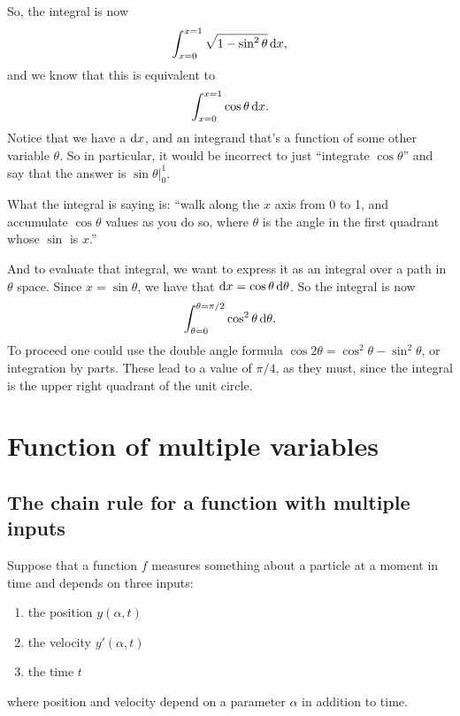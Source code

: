 \begin{example}
  So, the integral is now
  \begin{align*}
     \int _{x=0}^{x=1} \sqrt {1-\sin^{2} \theta} \dx,
  \end{align*}
  and we know that this is equivalent to
  \begin{align*}
     \int _{x=0}^{x=1} \cos \theta \dx.
  \end{align*}
  Notice that we have a $\dx$, and an integrand that's a function of some other variable $\theta$. So in
  particular, it would be incorrect to just ``integrate $\cos \theta$'' and say that the answer is
  $\sin \theta\Big|_0^1$.

  What the integral is saying is: ``walk along the $x$ axis from 0 to 1, and accumulate $\cos \theta$ values as
  you do so, where $\theta$ is the angle in the first quadrant whose $\sin$ is $x$.''

  And to evaluate that integral, we want to express it as an integral over a path in $\theta$
  space. Since $x = \sin \theta$, we have that $\dx = \cos \theta \d\theta$. So the integral is now
  \begin{align*}
    \int_{\theta=0}^{\theta=\pi/2} \cos^2 \theta \d\theta.
  \end{align*}
  To proceed one could use the double angle formula $\cos 2\theta = \cos^2\theta - \sin^2\theta$, or integration
  by parts. These lead to a value of $\pi/4$, as they must, since the integral is the upper right
  quadrant of the unit circle.
\end{example}




\section{Function of multiple variables }
\subsection{The chain rule for a function with multiple inputs}

Suppose that a function $f$ measures something about a particle at a moment in time and depends on
three inputs:
\begin{enumerate}
\item the position $y(\alpha, t)$
\item the velocity $y'(\alpha, t)$
\item the time $t$
\end{enumerate}
where position and velocity depend on a parameter $\alpha$ in addition to time.


